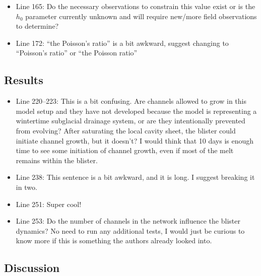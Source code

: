 \documentclass[11pt]{article}
\begin{document}
\begin{itemize}[leftmargin=*]
\item Line 165: Do the necessary observations to constrain this value exist or is the $h_0$ parameter
currently unknown and will require new/more field observations to determine?

\item Line 172: ``the Poisson’s ratio'' is a bit awkward, suggest changing to ``Poisson’s ratio'' or ``the
Poisson ratio''
\end{itemize}

\subsection*{Results}

\begin{itemize}[leftmargin=*]
\item Line 220--223: This is a bit confusing. Are channels allowed to grow in this model setup and they
have not developed because the model is representing a wintertime subglacial drainage system,
or are they intentionally prevented from evolving? After saturating the local cavity sheet, the
blister could initiate channel growth, but it doesn’t? I would think that 10 days is enough time to
see some initiation of channel growth, even if most of the melt remains within the blister.

\item Line 238: This sentence is a bit awkward, and it is long. I suggest breaking it in two.

\item Line 251: Super cool!

\item Line 253: Do the number of channels in the network influence the blister dynamics? No need to run
any additional tests, I would just be curious to know more if this is something the authors already
looked into.
\end{itemize}

\subsection*{Discussion}
\end{document}
